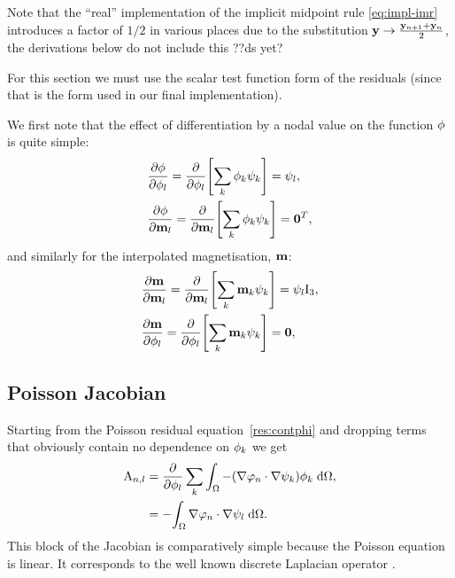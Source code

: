 Note that the ``real'' implementation of the implicit midpoint rule \eqref{eq:impl-imr} introduces a factor of $1/2$ in various places due to the substitution $ \mathbf{y} \rightarrow \frac{\mathbf{y}_{n+1} + \mathbf{y}_n}{2}$, the derivations below do not include this ??ds yet?

For this section we must use the scalar test function form of the residuals (since that is the form used in our final implementation).

We first note that the effect of differentiation by a nodal value on the function $\phi$ is quite simple:
\begin{equation}
  \begin{aligned}
    &\frac{\partial \phi}{\partial \phi_l} = \frac{\partial }{\partial \phi_l} {\left[  \sum_k \phi_k {\psi_k}  \right]} = \psi_l, \\
    &\frac{\partial \phi}{\partial \mathbf{m}_l} = \frac{\partial }{\partial \mathbf{m}_l} {\left[  \sum_k \phi_k {\psi_k}  \right]} = \mathbf{0}^T, \\
  \end{aligned}
\end{equation}
and similarly for the interpolated magnetisation, $\mathbf{m}$:
\begin{equation}
  \begin{aligned}
    &\frac{\partial \mathbf{m}}{\partial \mathbf{m}_l} = \frac{\partial }{\partial \mathbf{m}_l} {\left[  \sum_k \mathbf{m}_k {\psi_k}  \right]} = \psi_l \text{I}_3, \\
    &\frac{\partial \mathbf{m}}{\partial \phi_l} = \frac{\partial }{\partial \phi_l} {\left[  \sum_k \mathbf{m}_k {\psi_k}  \right]} = \mathbf{0}, \\
\end{aligned} 
\end{equation}

\subsection{Poisson Jacobian}
\label{sec:poisson-jacobian}

Starting from the Poisson residual equation~\eqref{res:contphi} and dropping terms that obviously contain no dependence on $\phi_k$ we get
\begin{equation}
  \begin{aligned}
    \label{eq:poisson-jacobian}
    \mathrm{A}_{n,l} &= \frac{\partial }{\partial \phi_{l}} \sum_k {\int_{\Omega}  -(\nabla \varphi_n \cdot \nabla \psi_k) \phi_{k} {\; \text{d}} {\Omega}}, \\
    &= -{\int_{\Omega} \nabla \varphi_n \cdot \nabla \psi_l {\; \text{d}} {\Omega}}.
  \end{aligned}
\end{equation}
This block of the Jacobian is comparatively simple because the Poisson equation is linear. 
It corresponds to the well known discrete Laplacian operator \cite{HowardElmanDavidSilvester2006}.


